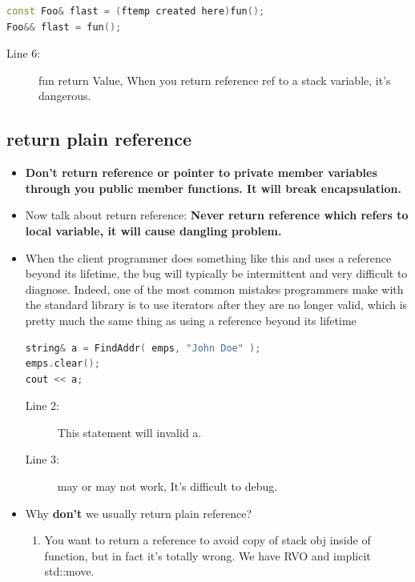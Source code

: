 \documentclass[a4paper,11pt,twoside]{book}
\begin{document}
\begin{itemize}
\begin{enumerate}
\begin{lstlisting}[frame=single, language=c++]
const Foo& flast = (ftemp created here)fun();
Foo&& flast = fun();
\end{lstlisting}
\begin{description}
	\item[Line 6:] fun return Value, When you return reference ref to a stack variable, it's dangerous.
\end{description}

	\end{enumerate}
	
	\end{itemize}

\subsection{return plain reference} 
\begin{itemize}
	\item \textbf{Don't return reference or pointer to private member variables through you public member functions. It will break encapsulation. }
	
	\item Now talk about return reference: \textbf{Never return reference which refers to local variable, it will cause dangling problem.} 
	
	\item  When the client programmer does something like this and uses a reference beyond its lifetime, the bug will typically be intermittent and very difficult to diagnose. Indeed, one of the most common mistakes programmers make with the standard library is to use iterators after they are no longer valid, which is pretty much the same thing as using a reference beyond its lifetime
	
\begin{lstlisting}[frame=single, language=c++, mathescape=true]
string& a = FindAddr( emps, "John Doe" );
emps.clear(); 
cout << a; 
\end{lstlisting}
	\begin{description}
		\item[Line 2:] This statement will invalid a.
		\item[Line 3:] may or may not work, It's difficult to debug.
	\end{description}
	
	\item Why \textbf{don't} we usually return plain reference?
	\begin{enumerate}
	\item You want to return a reference to avoid copy of stack obj inside of function, but in fact it's totally wrong. We have RVO and implicit std::move.
	

\end{enumerate}
\end{itemize}
\end{document}
